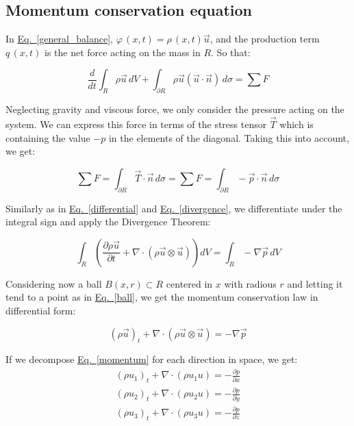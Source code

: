 \documentclass{article}
\begin{document}
\subsection{Momentum conservation equation}

In \hyperref[general_balance]{Eq.~\ref{general_balance}}, $\varphi \, (x,t)=\rho \, (x,t) \vec{u}$, and the production term $q\, (x,t)$ is the net force acting on the mass in $R$. So that:

\begin{equation}
\dfrac{d}{dt}\int_R \rho \vec{u} \, dV + \int_{\partial R} \rho \vec{u} (\vec{u}\cdot \vec{n}) \, d\sigma=\sum F
\end{equation}

Neglecting gravity and viscous force, we only consider the pressure acting on the system. We can express this force in terms of the stress tensor $\vec{T}$ which is containing the value $-p$ in the elements of the diagonal. Taking this into account, we get:

\begin{equation}
\sum F=\int_{\partial R}\vec{T}\cdot \vec{n} \, d\sigma=\sum F=\int_{\partial R}-\vec{p}\cdot \vec{n} \, d\sigma
\end{equation}

Similarly as in \hyperref[differential]{Eq.~\ref{differential}} and \hyperref[divergence]{Eq.~\ref{divergence}}, we differentiate under the integral sign and apply the Divergence Theorem:

\begin{equation}
\int_R \left( \frac{\partial \rho \vec{u}}{\partial t} + \nabla \cdot (\rho \vec{u} \otimes \vec{u}) \right) dV=\int_R -\nabla \vec{p} \, dV
\end{equation}

Considering now a ball $B(x,r) \subset R$ centered in $x$ with radious $r$ and letting it tend to a point as in \hyperref[ball]{Eq.~\ref{ball}}, we get the momentum conservation law in differential form:


\begin{equation}
\label{momentum}
\boxed{
(\rho \vec{u})_t  + \nabla \cdot (\rho \vec{u} \otimes \vec{u})=-\nabla \vec{p}
}
\end{equation}

If we decompose \hyperref[momentum]{Eq.~\ref{momentum}} for each direction in space, we get:
\begin{eqnarray}
\label{1direction}
(\rho u_1)_t  + \nabla \cdot (\rho u_1 u)=-\frac{\partial p}{\partial x} \\
\label{2direction}
(\rho u_2)_t  + \nabla \cdot (\rho u_2 u)=-\frac{\partial p}{\partial y} \\
\label{3direction}
(\rho u_3)_t  + \nabla \cdot (\rho u_3 u)=-\frac{\partial p}{\partial z}
\end{eqnarray}
\end{document}
